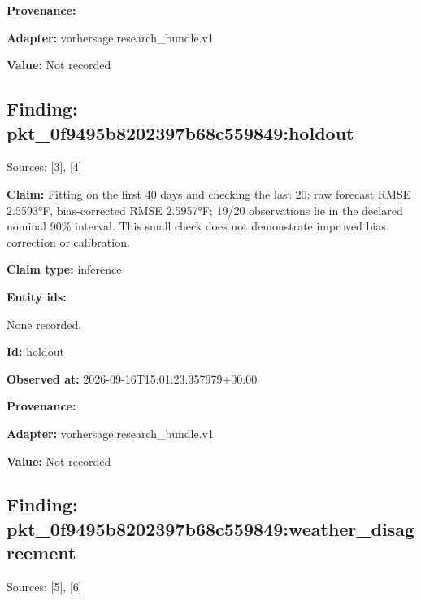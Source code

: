 \documentclass[11pt]{article}
\begin{document}
\par\noindent\textbf{Provenance:} \par \par\noindent\textbf{Adapter:} vorhersage.r\hspace{0pt}esearch\_bund\hspace{0pt}le.v1

\par\noindent\textbf{Value:} Not recorded

\subsection*{\textcolor{epdarkgreen}{Finding: pkt\_0f9495b8\hspace{0pt}202397b68c55\hspace{0pt}9849:holdout}}
Sources: [3], [4]


\par\noindent\textbf{Claim:} Fitting on the first 40 days and checking the last 20: raw forecast RMSE 2.5593°F, bias-corrected RMSE 2.5957°F; 19/20 observations lie in the declared nominal 90\% interval. This small check does not demonstrate improved bias correction or calibration.

\par\noindent\textbf{Claim type:} inference

\par\noindent\textbf{Entity ids:} \par None recorded.

\par\noindent\textbf{Id:} holdout

\par\noindent\textbf{Observed at:} 2026-09-16T1\hspace{0pt}5:01:23.3579\hspace{0pt}79+00:00

\par\noindent\textbf{Provenance:} \par \par\noindent\textbf{Adapter:} vorhersage.r\hspace{0pt}esearch\_bund\hspace{0pt}le.v1

\par\noindent\textbf{Value:} Not recorded

\subsection*{\textcolor{epdarkgreen}{Finding: pkt\_0f9495b8\hspace{0pt}202397b68c55\hspace{0pt}9849:weather\hspace{0pt}\_disagreemen\hspace{0pt}t}}
Sources: [5], [6]
\end{document}
